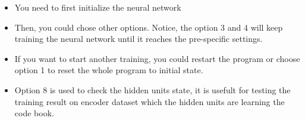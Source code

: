 \documentclass[11pt]{article}
\begin{document}
\begin{itemize}
\item You need to first initialize the neural network
\item Then, you could chose other options. Notice, the option 3 and 4 will keep training the neural network until it reaches the pre-specific settings.
\item If you want to start another training, you could restart the program or choose option 1 to reset the whole program to initial state.
\item Option 8 is used to check the hidden units state, it is usefult for testing the training result on encoder dataset which the hidden units are learning the code book.
\end{itemize}
\end{document}
